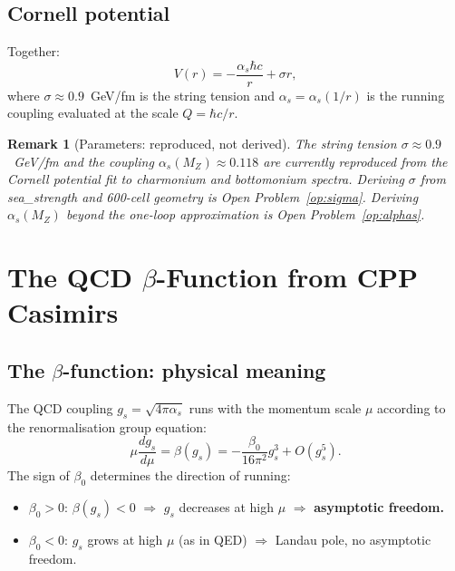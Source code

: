 \documentclass[11pt,a4paper]{article}
\newtheorem{remark}[theorem]{Remark}
\newcommand{\as}{\alpha_s}
\begin{document}
\subsection{Cornell potential}

Together:
\begin{equation}
V(r) = -\frac{\as\hbar c}{r} + \sigma r,
\label{eq:cornell}
\end{equation}
where $\sigma \approx 0.9$~GeV/fm is the string tension
\citep{bali2001} and $\as = \as(1/r)$ is the running coupling
evaluated at the scale $Q = \hbar c/r$.

\begin{remark}[Parameters: reproduced, not derived]
The string tension $\sigma \approx 0.9$~GeV/fm and the coupling
$\as(M_Z) \approx 0.118$ are currently reproduced from the Cornell
potential fit to charmonium and bottomonium spectra.  Deriving
$\sigma$ from sea\_strength and 600-cell geometry is
Open Problem~\ref{op:sigma}.  Deriving $\as(M_Z)$ beyond the
one-loop approximation is Open Problem~\ref{op:alphas}.
\end{remark}

\section{The QCD $\beta$-Function from CPP Casimirs}
\label{sec:beta}

\subsection{The $\beta$-function: physical meaning}

The QCD coupling $g_s = \sqrt{4\pi\as}$ runs with the momentum
scale $\mu$ according to the renormalisation group equation:
\begin{equation}
\mu\frac{dg_s}{d\mu} = \beta(g_s)
= -\frac{\beta_0}{16\pi^2}g_s^3 + O(g_s^5).
\label{eq:rge}
\end{equation}
The sign of $\beta_0$ determines the direction of running:
\begin{itemize}
\item $\beta_0 > 0$: $\beta(g_s) < 0$ $\Rightarrow$ $g_s$ decreases
  at high $\mu$ $\Rightarrow$ \textbf{asymptotic freedom.}
\item $\beta_0 < 0$: $g_s$ grows at high $\mu$ (as in QED) $\Rightarrow$
  Landau pole, no asymptotic freedom.
\end{itemize}
\end{document}
